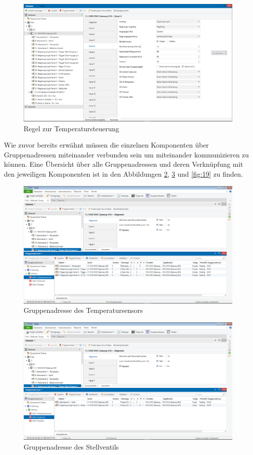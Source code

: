 \documentclass[a4paper]{article}
\begin{document}
\begin{figure}[H]
	\centering
	\includegraphics[width=13cm]{Doku/16}
	\caption{Regel zur Temperatursteuerung}
	\label{fig:16}
\end{figure}

Wie zuvor bereits erwähnt müssen die einzelnen Komponenten über Gruppenadressen miteinander verbunden sein um miteinander kommunizieren zu können.
Eine Übersicht über alle Gruppenadressen und deren Verknüpfung mit den jeweiligen Komponenten ist in den Abbildungen \ref{fig:17}, \ref{fig:18} und \ref{fig:19} zu finden.

\begin{figure}[H]
	\centering
	\includegraphics[width=13cm]{Doku/17}
	\caption{Gruppenadresse des Temperatursensors}
	\label{fig:17}
\end{figure}

\begin{figure}[H]
	\centering
	\includegraphics[width=13cm]{Doku/18}
	\caption{Gruppenadresse des Stellventils}
	\label{fig:18}
\end{figure}
\end{document}

